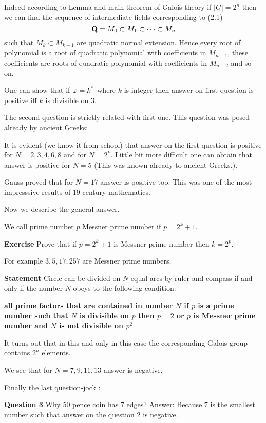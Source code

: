     Indeed according to Lemma and main theorem  of Galois theory if $|G|=2^n$ then
    we can find the sequence of intermediate fields corresponding to
    (2.1)
                      $$
        {\bf Q}=M_0\subset M_1\subset \dots\subset M_n
                      $$
          such that $M_k\subset M_{k+1}$ are quadratic normal extension.
     Hence every root of polynomial is a root of quadratic polynomial
          with coefficients in $M_{n-1}$, these coefficients
          are roots of quadratic polynomial with coefficients in $M_{n-2}$
          and so on.

    One can show that if $\varphi=k^{^{\circ}}$ where $k$ is integer then
       answer on first question is positive iff $k$ is divisible on $3$.

 The second question is strictly related with first one.
  This question  was posed already
   by ancient Greeks:

   It is evident (we know it from school)
   that answer on the first question is positive for $N=2,3,4,6,8$ and
  for $N=2^k$. Little bit more difficult one can obtain that answer is positive for
  $N=5$ (This was known already to ancient Greeks.).

  Gauss proved that for $N=17$ answer is positive too. This was one of the
  most impresssive results of 19 century mathematics.

  Now we describe the general answer.

    We call prime number $p$ Messner prime number if $p=2^k+1$.

    {\bf Exercise} Prove that if $p=2^k+1$ is Messner prime number then
     $k=2^p$.

     For example $3,5,17,257$ are Messner prime numbers.

     {\bf Statement} Circle can be divided on $N$ equal arcs
           by ruler and compass if and only if the number
           $N$ obeys to the following condition:



           {\bf all prime factors that are contained in number $N$
           if $p$ is a prime number such that $N$ is divisible on $p$
           then $p=2$ or $p$ is Messner prime number and $N$ is not divisible
           on $p^2$}


It turns out that in this and only in this case the corresponding
Galois group contains $2^n$ elements.



We see that for $N=7,9,11,13$ answer is negative.


Finally the last question-jock :

{\bf Question 3} Why 50 pence coin has 7 edges?
Answer: Because  $7$ is the smallest number such that
answer on the question 2 is negative.


\bye

